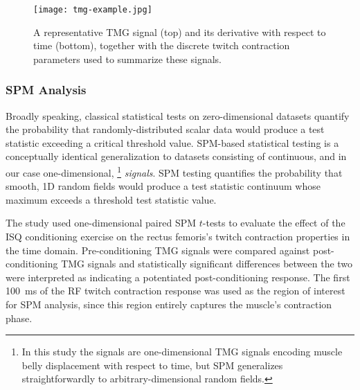 \documentclass[utf8]{style/FrontiersinHarvard}
\begin{document}
\begin{figure}
	\centering
    \texttt{[image: tmg-example.jpg]}
    \caption{A representative TMG signal (top) and its derivative with respect to time (bottom), together with the discrete twitch contraction parameters used to summarize these signals.}
    \label{fig:tmg_example}
\end{figure}

\subsubsection{SPM Analysis}
Broadly speaking, classical statistical tests on zero-dimensional datasets quantify the probability that randomly-distributed scalar data would produce a test statistic exceeding a critical threshold value.
SPM-based statistical testing is a conceptually identical generalization to datasets consisting of continuous, and in our case one-dimensional,%
\footnote{In this study the signals are one-dimensional TMG signals encoding muscle belly displacement with respect to time, but SPM generalizes straightforwardly to arbitrary-dimensional random fields.}
\textit{signals}.
SPM testing quantifies the probability that smooth, 1D random fields would produce a test statistic continuum whose maximum exceeds a threshold test statistic value.

The study used one-dimensional paired SPM $ t $-tests to evaluate the effect of the ISQ conditioning exercise on the rectus femoris's twitch contraction properties in the time domain.
Pre-conditioning TMG signals were compared against post-conditioning TMG signals and statistically significant differences between the two were interpreted as indicating a potentiated post-conditioning response.
The first \SI{100}{\milli \second} of the RF twitch contraction response was used as the region of interest for SPM analysis, since this region entirely captures the muscle's contraction phase.
\end{document}
